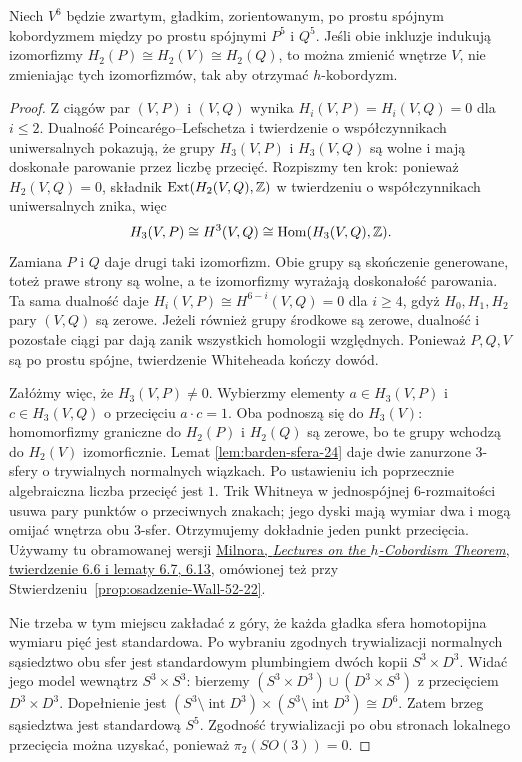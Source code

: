 \begin{lemat}
\label{lem:barden-usuniecie-24}
Niech $V^6$ będzie zwartym, gładkim,
zorientowanym, po prostu spójnym
kobordyzmem między po prostu spójnymi
$P^5$ i $Q^5$. Jeśli obie inkluzje
indukują izomorfizmy
$H_2(P)\cong H_2(V)\cong H_2(Q)$,
to można zmienić wnętrze $V$, nie
zmieniając tych izomorfizmów, tak aby
otrzymać $h$-kobordyzm.
\end{lemat}
\begin{proof}
Z ciągów par $(V,P)$ i $(V,Q)$
wynika $H_i(V,P)=H_i(V,Q)=0$
dla $i\leq2$. Dualność
Poincarégo--Lefschetza i twierdzenie
o współczynnikach uniwersalnych
pokazują, że grupy
$H_3(V,P)$ i $H_3(V,Q)$ są wolne
i mają doskonałe parowanie przez
liczbę przecięć. Rozpiszmy ten krok: ponieważ
$H_2(V,Q)=0$, składnik
$\operatorname{Ext}(H_2(V,Q),\mathbb{Z})$ w twierdzeniu
o współczynnikach uniwersalnych znika, więc
\[
 H_3(V,P)\cong H^3(V,Q)
   \cong\operatorname{Hom}(H_3(V,Q),\mathbb{Z}).
\]
Zamiana $P$ i $Q$ daje drugi taki izomorfizm.
Obie grupy są skończenie generowane, toteż prawe
strony są wolne, a te izomorfizmy wyrażają
doskonałość parowania. Ta sama dualność daje
$H_i(V,P)\cong H^{6-i}(V,Q)=0$ dla $i\geq4$,
gdyż $H_0,H_1,H_2$ pary $(V,Q)$ są zerowe.
Jeżeli również grupy środkowe są zerowe,
dualność i pozostałe ciągi par dają
zanik wszystkich homologii względnych.
Ponieważ $P,Q,V$ są po prostu spójne,
twierdzenie Whiteheada kończy dowód.

Załóżmy więc, że $H_3(V,P)\ne0$.
Wybierzmy elementy
$a\in H_3(V,P)$ i $c\in H_3(V,Q)$
o przecięciu $a\cdot c=1$.
Oba podnoszą się do $H_3(V)$:
homomorfizmy graniczne do
$H_2(P)$ i $H_2(Q)$ są zerowe,
bo te grupy wchodzą do $H_2(V)$
izomorficznie. Lemat
\ref{lem:barden-sfera-24} daje
dwie zanurzone $3$-sfery o
trywialnych normalnych wiązkach.
Po ustawieniu ich poprzecznie
algebraiczna liczba przecięć jest $1$.
Trik Whitneya w jednospójnej
$6$-rozmaitości usuwa pary punktów
o przeciwnych znakach; jego dyski
mają wymiar dwa i mogą omijać wnętrza
obu $3$-sfer. Otrzymujemy dokładnie
jeden punkt przecięcia.
Używamy tu obramowanej wersji
\href{https://webhomes.maths.ed.ac.uk/~v1ranick/surgery/hcobord.pdf}
{Milnora, \emph{Lectures on the $h$-Cobordism
Theorem}, twierdzenie 6.6 i lematy 6.7, 6.13},
omówionej też przy
Stwierdzeniu~\ref{prop:osadzenie-Wall-52-22}.

Nie trzeba w tym miejscu zakładać
z góry, że każda gładka sfera
homotopijna wymiaru pięć jest standardowa.
Po wybraniu zgodnych trywializacji
normalnych sąsiedztwo obu sfer
jest standardowym plumbingiem
dwóch kopii $S^3\times D^3$.
Widać jego model wewnątrz
$S^3\times S^3$: bierzemy
$(S^3\times D^3)\cup(D^3\times S^3)$
z przecięciem $D^3\times D^3$.
Dopełnienie jest
$(S^3\setminus\operatorname{int}D^3)
\times(S^3\setminus\operatorname{int}D^3)
\cong D^6$. Zatem brzeg sąsiedztwa
jest standardową $S^5$. Zgodność
trywializacji po obu stronach
lokalnego przecięcia można uzyskać,
ponieważ $\pi_2(SO(3))=0$.


\end{proof}
